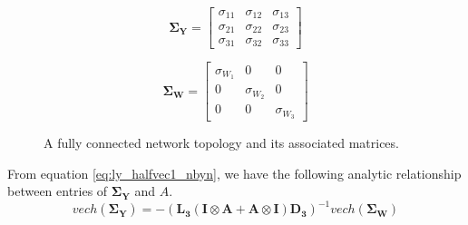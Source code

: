 \documentclass{article}
\begin{document}
\begin{figure}[H]
\begin{minipage}[c]{0.25\textwidth}
\[
\mathbf{\Sigma_Y}=
\begin{bmatrix}
\sigma_{11} & \sigma_{12} & \sigma_{13} \\
\sigma_{21} & \sigma_{22} & \sigma_{23} \\
\sigma_{31} & \sigma_{32} & \sigma_{33}
\end{bmatrix}
\]

\end{minipage}%
\hspace{0.005\textwidth}%
\begin{minipage}[c]{0.27\textwidth}
\raggedright

\[
\mathbf{\Sigma_W}=
\begin{bmatrix}
\sigma_{W_1} & 0 & 0 \\
0 & \sigma_{W_2} & 0 \\
0 & 0 & \sigma_{W_3}
\end{bmatrix}
\]

\end{minipage}%

\caption{A fully connected network topology and its associated matrices.}
\label{fig:network3by3_full}
\end{figure}


From equation \ref{eq:ly_halfvec1_nbyn}, we have the following analytic relationship between entries of $\mathbf{\Sigma_Y}$ and $A$.
\begin{equation}
    vech (\boldsymbol{\Sigma}_\mathbf{Y})=
    -(\mathbf{L_3}(\mathbf{I} \otimes \mathbf{A} + \mathbf{A} \otimes \mathbf{I}) \mathbf{D_3})^{-1}vech(\boldsymbol{\Sigma}_\mathbf{W})
    \label{eq:lyapunov_33}
\end{equation}
\end{document}
